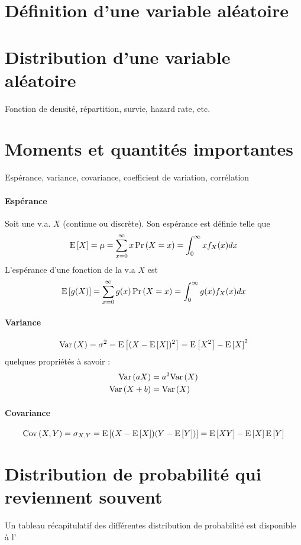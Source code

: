 \section{Définition d'une variable aléatoire}

\section{Distribution d'une variable aléatoire}
Fonction de densité, répartition, survie, hazard rate, etc.

\section{Moments et quantités importantes}
Espérance, variance, covariance, coefficient de variation, corrélation

\paragraph{Espérance} Soit une v.a. $X$ (continue ou discrète). Son espérance est définie telle que
\begin{equation}
\label{eq:esp-univarie}
\mathrm{E} \left[ X \right] = \mu = \sum_{x=0}^{\infty} x \Pr \left( X = x \right) = \int_{0}^{\infty} x f_X(x) dx
\end{equation}
L'espérance d'une fonction de la v.a $X$ est
\begin{equation}
\label{eq:esp-fct-univarie}
\mathrm{E} \left[ g(X) \right] = \sum_{x=0}^{\infty} g(x) \Pr \left( X = x \right) = \int_{0}^{\infty} g(x) f_X(x) dx
\end{equation}

\paragraph{Variance}
\begin{equation}
\label{eq:variance}
\mathrm{Var} \left( X \right) = \sigma^2 = \mathrm{E} \left[ (X - \mathrm{E} \left[ X \right])^2 \right] = \mathrm{E} \left[ X^2 \right] - \mathrm{E} \left[ X \right]^2
\end{equation}
quelques propriétés à savoir : 
\begin{align*}
\mathrm{Var} \left( aX \right) 		& = a^2 \mathrm{Var} \left( X \right) \\
\mathrm{Var} \left( X + b \right)	& = \mathrm{Var} \left( X \right)
\end{align*}

\paragraph{Covariance}
\begin{equation}
\label{eq:covariance}
\mathrm{Cov} \left( X,Y \right) =  \sigma_{X,Y} = \mathrm{E} \left[ (X-\mathrm{E} \left[ X \right])(Y - \mathrm{E} \left[ Y \right]) \right] = \mathrm{E} \left[ XY \right] - \mathrm{E} \left[ X \right] \mathrm{E} \left[ Y \right]
\end{equation}



\section{Distribution de probabilité qui reviennent souvent}
Un tableau récapitulatif des différentes distribution de probabilité est disponible à l'